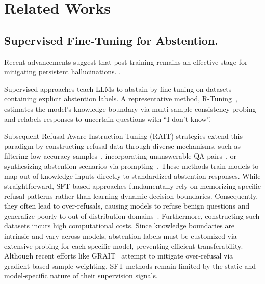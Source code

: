\documentclass{article} %
\begin{document}



\appendix  

\section{Related Works}
\subsection{Supervised Fine-Tuning for Abstention.}
Recent advancements suggest that post-training remains an effective stage for mitigating persistent hallucinations. \citep{h-neurons, KLCF}.

Supervised approaches teach LLMs to abstain by fine-tuning on datasets containing explicit abstention labels. 
A representative method, R-Tuning~\citep{R-Tuning}, estimates the model's knowledge boundary via multi-sample consistency probing and relabels responses to uncertain questions with ``I don't know''. 

Subsequent Refusal-Aware Instruction Tuning (RAIT) strategies extend this paradigm by constructing refusal data through diverse mechanisms, such as filtering low-accuracy samples~\citep{AlignmentforHonesty, CanAIKnowWhatTheyDontKnow,GATEAU}, incorporating unanswerable QA pairs~\citep{Laboratory-ScaleAI, wen2024Knowyourlimits}, or synthesizing abstention scenarios via prompting~\citep{Brahman2024SayingNo,DontJustSayIdontknow,Aligning, luo-etal-2025-lets}.
These methods train models to map out-of-knowledge inputs directly to standardized abstention responses.
While straightforward, SFT-based approaches fundamentally rely on memorizing specific refusal patterns rather than learning dynamic decision boundaries. 
Consequently, they often lead to over-refusals, causing models to refuse benign questions and generalize poorly to out-of-distribution domains~\citep{Understanding_RL}.
Furthermore, constructing such datasets incurs high computational costs. Since knowledge boundaries are intrinsic and vary across models, abstention labels must be customized via extensive probing for each specific model, preventing efficient transferability.
Although recent efforts like GRAIT~\citep{GRAIT} attempt to mitigate over-refusal via gradient-based sample weighting, SFT methods remain limited by the static and model-specific nature of their supervision signals.
\end{document}

